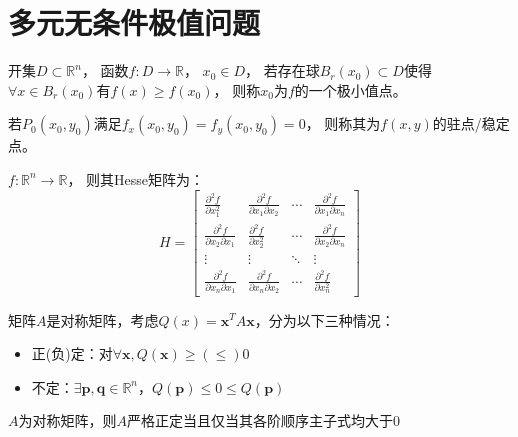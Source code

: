 \section{多元无条件极值问题}


\begin{definition}[极值与极值点]
  开集$D\subset \mathbb{R}^n$，
  函数$f: D \rightarrow \mathbb{R}$，
  $x_0 \in D$，
  若存在球$B_r(x_0) \subset D$使得$\forall x \in B_r(x_0)$有$f(x) \geq f(x_0)$，
  则称$x_0$为$f$的一个极小值点。
\end{definition}

\begin{definition}[驻点、稳定点]
  若$P_0(x_0,y_0)$满足$f_x(x_0,y_0) = f_y(x_0,y_0) = 0$，
  则称其为$f(x,y)$的驻点/稳定点。
\end{definition}

\begin{definition}[Hesse矩阵]
  $f:\mathbb{R}^n \rightarrow \mathbb{R}$，
  则其Hesse矩阵为：
  \begin{equation*}
    H = \left[
      \begin{array}{cccc}
        \frac{\partial^2 f}{\partial x_1^2}& \frac{\partial^2 f}{\partial x_1\partial x_2}& \cdots&\frac{\partial^2 f}{\partial x_1\partial x_n}\\
        \frac{\partial^2 f}{\partial x_2 \partial x_1}&\frac{\partial^2 f}{\partial x_2^2}&\cdots & \frac{\partial^2 f}{\partial x_2 \partial x_n}\\
        \vdots&\vdots&\ddots&\vdots\\
        \frac{\partial^2 f}{\partial x_n \partial x_1}& \frac{\partial^2 f}{\partial x_n \partial x_2}&\cdots & \frac{\partial^2 f}{\partial x_n^2}
      \end{array}
    \right]
  \end{equation*}
\end{definition}

\begin{definition}[正定、负定、不定]
  矩阵$A$是对称矩阵，考虑$Q(x) = \mathbf{x}^TA\mathbf{x}$，分为以下三种情况：
  \begin{itemize}
  \item 正(负)定：对$\forall \mathbf{x}, Q(\mathbf{x}) \geq(\leq) 0$
  \item 不定：$\exists \mathbf{p},\mathbf{q} \in \mathbb{R}^n$，$Q(\mathbf{p}) \leq 0 \leq Q(\mathbf{p})$
  \end{itemize}
\end{definition}

\begin{theorem}[正定的判别法]
  $A$为对称矩阵，则$A$严格正定当且仅当其各阶顺序主子式均大于$0$
\end{theorem}

